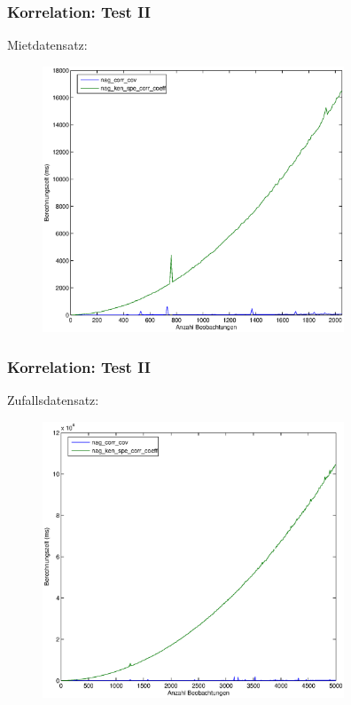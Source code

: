 \documentclass{beamer}
\begin{document}
\begin{frame}
	\frametitle{Korrelation: Test II}
	
	Mietdatensatz:
	
	\begin{figure}[t]
    \centering
    \includegraphics[width=9cm]{figures/test_corr_2_rent.eps}
  \end{figure}
\end{frame}

\begin{frame}
	\frametitle{Korrelation: Test II}
	
	Zufallsdatensatz:
	
	\begin{figure}[t]
    \centering
    \includegraphics[width=9cm]{figures/test_corr_2_random.eps}
  \end{figure}
\end{frame}
\end{document}
